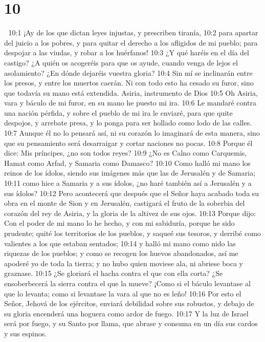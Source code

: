 \chapter{10}


10:1 ¡Ay de los que dictan leyes injustas, y prescriben tiranía,  
10:2 para apartar del juicio a los pobres, y para quitar el derecho a los afligidos de mi pueblo; para despojar a las viudas, y robar a los huérfanos!  
10:3 ¿Y qué haréis en el día del castigo? ¿A quién os acogeréis para que os ayude, cuando venga de lejos el asolamiento? ¿En dónde dejaréis vuestra gloria?  
10:4 Sin mí se inclinarán entre los presos, y entre los muertos caerán. Ni con todo esto ha cesado su furor, sino que todavía su mano está extendida.  
Asiria, instrumento de Dios  
10:5 Oh Asiria, vara y báculo de mi furor, en su mano he puesto mi ira.  
10:6 Le mandaré contra una nación pérfida, y sobre el pueblo de mi ira le enviaré, para que quite despojos, y arrebate presa, y lo ponga para ser hollado como lodo de las calles. 
10:7 Aunque él no lo pensará así, ni su corazón lo imaginará de esta manera, sino que su pensamiento será desarraigar y cortar naciones no pocas.  
10:8 Porque él dice: Mis príncipes, ¿no son todos reyes?  
10:9 ¿No es Calno como Carquemis, Hamat como Arfad, y Samaria como Damasco?  
10:10 Como halló mi mano los reinos de los ídolos, siendo sus imágenes más que las de Jerusalén y de Samaria;  
10:11 como hice a Samaria y a sus ídolos, ¿no haré también así a Jerusalén y a sus ídolos?  
10:12 Pero acontecerá que después que el Señor haya acabado toda su obra en el monte de Sion y en Jerusalén, castigará el fruto de la soberbia del corazón del rey de Asiria, y la gloria de la altivez de sus ojos.  
10:13 Porque dijo: Con el poder de mi mano lo he hecho, y con mi sabiduría, porque he sido prudente; quité los territorios de los pueblos, y saqueé sus tesoros, y derribé como valientes a los que estaban sentados;  
10:14 y halló mi mano como nido las riquezas de los pueblos; y como se recogen los huevos abandonados, así me apoderé yo de toda la tierra; y no hubo quien moviese ala, ni abriese boca y graznase.  
10:15 ¿Se gloriará el hacha contra el que con ella corta? ¿Se ensoberbecerá la sierra contra el que la mueve? ¡Como si el báculo levantase al que lo levanta; como si levantase la vara al que no es leño!  
10:16 Por esto el Señor, Jehová de los ejércitos, enviará debilidad sobre sus robustos, y debajo de su gloria encenderá una hoguera como ardor de fuego.  
10:17 Y la luz de Israel será por fuego, y su Santo por llama, que abrase y consuma en un día sus cardos y sus espinos.  
